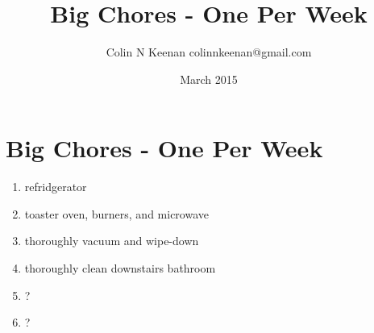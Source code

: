 \documentclass[12pt,letterpaper]{article}
\newcommand{\mytitle}{Big Chores - One Per Week}
\begin{document}
\title{\mytitle{}}
\author{Colin N Keenan colinnkeenan@gmail.com}
\date{March 2015}
\section*{\mytitle{}}
\begin{enumerate}
	\item refridgerator
	\item toaster oven, burners, and microwave
	\item thoroughly vacuum and wipe-down
	\item thoroughly clean downstairs bathroom
	\item ?
	\item ?
\end{enumerate}
\end{document}
